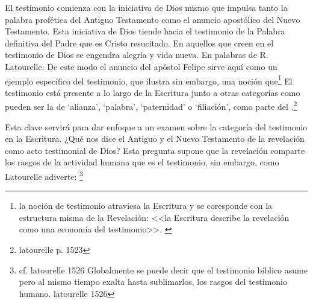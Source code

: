El testimonio comienza con la iniciativa de Dios mismo que impulsa tanto la
palabra profética del Antiguo Testamento como el anuncio apostólico del Nuevo
Testamento. Esta iniciativa de Dios tiende hacia el testimonio de la Palabra
definitiva del Padre que es Cristo resucitado. En aquellos que creen en el
testimonio de Dios se engendra alegría y vida nueva. En palabras de R.
Latourelle:
De este modo el anuncio del apóstol Felipe sirve aquí como un ejemplo específico
del testimonio, que ilustra sin embargo, una noción
que\footnote{la noción de testimonio atraviesa
  la Escritura y se coresponde con la estructura misma de la Revelación: <<la
  Escritura describe la revelación como una economía del testimonio>>.
  \autocite[109]{prades2015testimonio}} El testimonio está presente a lo largo
de la Escritura junto a otras categorías como pueden ser la de `alianza',
`palabra', `paternidad' o `filiación', como parte del .\footnote{latourelle p. 1523}

Esta clave servirá para dar enfoque a un examen sobre la categoría del
testimonio en la Escritura. ¿Qué nos dice el Antiguo y el Nuevo Testamento de la
revelación como acto testimonial de Dios? Esta pregunta supone que la revelación
comparte los rasgos de la actividad humana que es el testimonio, sin embargo,
como Latourelle adiverte: \footnote{cf. latourelle 1526 Globalmente se
  puede decir que el testimonio bíblico asume pero al mismo tiempo exalta hasta
  sublimarlos, los rasgos del testimonio humano. latourelle 1526}

